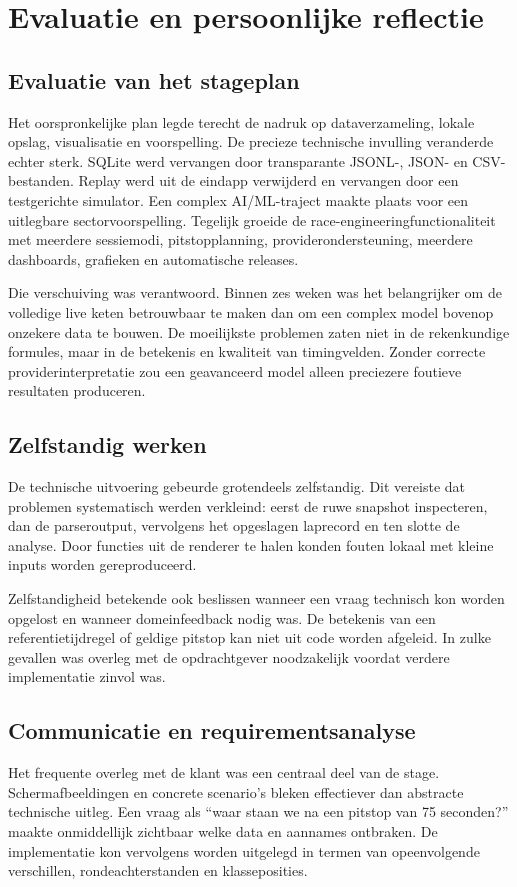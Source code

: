 \chapter{Evaluatie en persoonlijke reflectie}
\label{chap:reflectie}

\section{Evaluatie van het stageplan}
Het oorspronkelijke plan legde terecht de nadruk op dataverzameling, lokale opslag, visualisatie en voorspelling. De precieze technische invulling veranderde echter sterk. SQLite werd vervangen door transparante JSONL-, JSON- en CSV-bestanden. Replay werd uit de eindapp verwijderd en vervangen door een testgerichte simulator. Een complex AI/ML-traject maakte plaats voor een uitlegbare sectorvoorspelling. Tegelijk groeide de race-engineeringfunctionaliteit met meerdere sessiemodi, pitstopplanning, providerondersteuning, meerdere dashboards, grafieken en automatische releases.

Die verschuiving was verantwoord. Binnen zes weken was het belangrijker om de volledige live keten betrouwbaar te maken dan om een complex model bovenop onzekere data te bouwen. De moeilijkste problemen zaten niet in de rekenkundige formules, maar in de betekenis en kwaliteit van timingvelden. Zonder correcte providerinterpretatie zou een geavanceerd model alleen preciezere foutieve resultaten produceren.

\section{Zelfstandig werken}
De technische uitvoering gebeurde grotendeels zelfstandig. Dit vereiste dat problemen systematisch werden verkleind: eerst de ruwe snapshot inspecteren, dan de parseroutput, vervolgens het opgeslagen laprecord en ten slotte de analyse. Door functies uit de renderer te halen konden fouten lokaal met kleine inputs worden gereproduceerd.

Zelfstandigheid betekende ook beslissen wanneer een vraag technisch kon worden opgelost en wanneer domeinfeedback nodig was. De betekenis van een referentietijdregel of geldige pitstop kan niet uit code worden afgeleid. In zulke gevallen was overleg met de opdrachtgever noodzakelijk voordat verdere implementatie zinvol was.

\section{Communicatie en requirementsanalyse}
Het frequente overleg met de klant was een centraal deel van de stage. Schermafbeeldingen en concrete scenario's bleken effectiever dan abstracte technische uitleg. Een vraag als ``waar staan we na een pitstop van 75 seconden?'' maakte onmiddellijk zichtbaar welke data en aannames ontbraken. De implementatie kon vervolgens worden uitgelegd in termen van opeenvolgende verschillen, rondeachterstanden en klasseposities.


